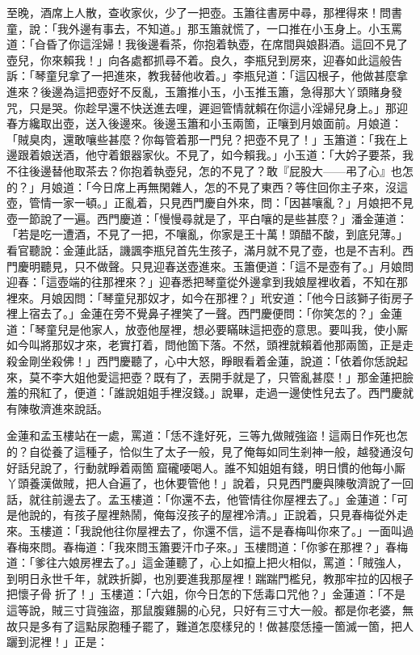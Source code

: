 至晚，酒席上人散，查收家伙，少了一把壺。玉簫往書房中尋，那裡得來！問書童，說：「我外邊有事去，不知道。」那玉簫就慌了，一口推在小玉身上。小玉罵道：「㒲昏了你這淫婦！我後邊看茶，你抱着執壺，在席間與娘斟酒。這回不見了壺兒，你來賴我！」向各處都抓尋不着。良久，李瓶兒到房來，迎春如此這般告訴：「琴童兒拿了一把進來，教我替他收着。」李瓶兒道：「這囚根子，他做甚麼拿進來？後邊為這把壺好不反亂，玉簫推小玉，小玉推玉簫，急得那大丫頭賭身發咒，只是哭。你趁早還不快送進去哩，遲迴管情就賴在你這小淫婦兒身上。」那迎春方纔取出壺，送入後邊來。後邊玉簫和小玉兩箇，正嚷到月娘面前。月娘道：「賊臭肉，還敢嚷些甚麼？你每管着那一門兒？把壺不見了！」玉簫道：「我在上邊跟着娘送酒，他守着銀器家伙。不見了，如今賴我。」小玉道：「大妗子要茶，我不往後邊替他取茶去？你抱着執壺兒，怎的不見了？敢『屁股大——弔了心』也怎的？」月娘道：「今日席上再無閑雜人，怎的不見了東西？等住回你主子來，沒這壺，管情一家一頓。」正亂着，只見西門慶自外來，問：「因甚嚷亂？」月娘把不見壺一節說了一遍。西門慶道：「慢慢尋就是了，平白嚷的是些甚麼？」潘金蓮道：「若是吃一遭酒，不見了一把，不嚷亂，你家是王十萬！頭醋不酸，到底兒薄。」{}看官聽說：金蓮此話，譏諷李瓶兒首先生孩子，滿月就不見了壺，也是不吉利。西門慶明聽見，只不做聲。只見迎春送壺進來。玉簫便道：「這不是壺有了。」月娘問迎春：「這壺端的往那裡來？」迎春悉把琴童從外邊拿到我娘屋裡收着，不知在那裡來。月娘因問：「琴童兒那奴才，如今在那裡？」玳安道：「他今日該獅子街房子裡上宿去了。」金蓮在旁不覺鼻子裡笑了一聲。西門慶便問：「你笑怎的？」金蓮道：「琴童兒是他家人，放壺他屋裡，想必要瞞昧這把壺的意思。要叫我，使小厮如今叫將那奴才來，老實打着，問他箇下落。不然，頭裡就賴着他那兩箇，正是走殺金剛坐殺佛！」西門慶聽了，心中大怒，睜眼看着金蓮，{}說道：「依着你恁說起來，莫不李大姐他愛這把壺？既有了，丟開手就是了，只管亂甚麼！」那金蓮把臉羞的飛紅了，便道：「誰說姐姐手裡沒錢。」說畢，走過一邊使性兒去了。西門慶就有陳敬濟進來說話。

金蓮和孟玉樓站在一處，罵道：「恁不逢好死，三等九做賊強盜！這兩日作死也怎的？自從養了這種子，恰似生了太子一般，見了俺每如同生剎神一般，越發通沒句好話兒說了，行動就睜着兩箇𣭈窟礲喓喝人。誰不知姐姐有錢，明日慣的他每小厮丫頭養漢做賊，把人㒲遍了，也休要管他！」說着，只見西門慶與陳敬濟說了一回話，就往前邊去了。孟玉樓道：「你還不去，他管情往你屋裡去了。」金蓮道：「可是他說的，有孩子屋裡熱鬧，俺每沒孩子的屋裡冷清。」正說着，只見春梅從外走來。玉樓道：「我說他往你屋裡去了，你還不信，這不是春梅叫你來了。」一面叫過春梅來問。春梅道：「我來問玉簫要汗巾子來。」{}玉樓問道：「你爹在那裡？」春梅道：「爹往六娘房裡去了。」這金蓮聽了，心上如攛上把火相似，罵道：「賊強人，到明日永世千年，就跌折脚，也別要進我那屋裡！踹踹門檻兒，教那牢拉的囚根子把懷子骨𢱉折了！」玉樓道：「六姐，你今日怎的下恁毒口咒他？」金蓮道：「不是這等說，賊三寸貨強盜，那鼠腹雞腸的心兒，只好有三寸大一般。都是你老婆，無故只是多有了這點尿胞種子罷了，難道怎麼樣兒的！做甚麼恁擡一箇滅一箇，把人躧到泥裡！」正是：

